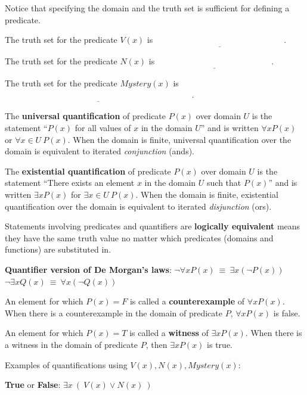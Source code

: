 \documentclass[12pt, oneside]{article}
\begin{document}
Notice that specifying the domain and the truth set is sufficient for defining
a predicate. 

The truth set for the predicate $V(x)$ is $\underline{\phantom{\{ x ~\mid~ V(x) = T\} = \{ 001, 010, 011 \}}}$.

The truth set for the predicate $N(x)$ is $\underline{\phantom{\{ x ~\mid~ N(x) = T\} = \{ 101, 111 \}}}$.

The truth set for the predicate $Mystery(x)$ is $\underline{\phantom{\{ x ~\mid~ Mystery(x) = T\} = \{ 000, 001, 010, 101, 111 \}}}$.


\vfill \newpage


The {\bf universal quantification} of predicate $P(x)$ over
domain $U$ is the statement ``$P(x)$ for all values of $x$ in the domain $U$''
and is written $\forall x P(x)$ or $\forall x \in U ~P(x)$. 
When the domain is finite, universal quantification over the domain 
is equivalent to iterated {\it conjunction} (ands).

The {\bf existential quantification} of predicate $P(x)$ 
over domain $U$ is the statement ``There exists an element $x$ 
in the domain $U$ such that $P(x)$'' and is written $\exists x P(x)$
for $\exists x \in U ~P(x)$. 
When the domain is finite, existential quantification over the domain 
is equivalent to iterated {\it disjunction} (ors).
 \vfill


Statements involving predicates and quantifiers are {\bf logically equivalent} 
means they have the same truth value no matter which predicates (domains and functions) 
are substituted in. 

{\bf Quantifier version of De Morgan's laws}: 
$\boxed{\neg \forall x P(x) ~\equiv~ \exists x \left( \neg P(x) \right)}$
\qquad
\qquad
$\boxed{\neg \exists x Q(x) ~\equiv~ \forall x \left( \neg Q(x) \right)}$
 \vfill
\vfill


An element for which $P(x) = F$ is called a {\bf counterexample} of $\forall x P(x)$. When there is a counterexample in the domain of predicate $P$,  $\forall x P(x)$ is false.


An element for which $P(x) = T$ is called a {\bf witness} of $\exists x P(x)$. When there is a witness in the domain of predicate $P$, then $\exists x P(x)$ is true.
 \vfill


Examples of quantifications using $V(x), N(x), Mystery(x)$:



{\bf True} or {\bf False}: $\exists x~ (~V(x) \lor N(x)~)$

\vfill
\end{document}
